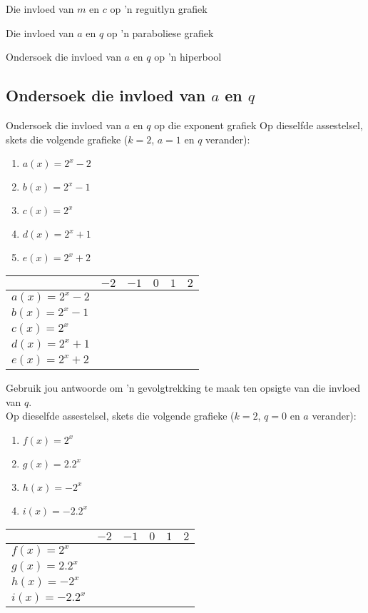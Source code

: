 \begin{Ondersoek}{Die invloed van $m$ en $c$ op 'n reguitlyn grafiek}
\begin{Ondersoek}{Die invloed van $a$ en $q$ op 'n paraboliese grafiek}
\begin{Ondersoek}{Ondersoek die invloed van $a$ en $q$ op 'n hiperbool}
\subsection*{Ondersoek die invloed van $a$ en $q$}
\begin{Ondersoek}{Ondersoek die invloed van $a$ en $q$ op die exponent grafiek}
Op dieselfde assestelsel, skets die volgende grafieke ($k=2$, $a=1$ en $q$ verander):
\begin{enumerate}[noitemsep, label=\textbf{\alph*}. ] 
\item $a(x)=2^{x}-2$
\item $b(x)=2^{x}-1$
\item $c(x)=2^{x}$
\item $d(x)=2^{x}+1$
\item $e(x)=2^{x}+2$
\end{enumerate}

\begin{table}[H]
\begin{center}
\begin{tabular}{|l|c|c|c|c|c|}
\hline
   &  $-2$ & $-1$ & $0$ & $1$ & $2$ 
\\ \hline
$a(x)=2^{x}-2$&  &&&&
\\ \hline
 $b(x)=2^{x}-1$&  &&&&
\\ \hline
$c(x)=2^{x}$&  &&&&
\\ \hline
$d(x)=2^{x}+1$&  &&&&
\\ \hline
$e(x)=2^{x}+2$&  &&&&
\\ \hline
\end{tabular}
\end{center}
\end{table}
Gebruik jou antwoorde om ’n gevolgtrekking te maak ten opsigte van die invloed van $q$.
\\

Op dieselfde assestelsel, skets die volgende grafieke ($k=2$, $q=0$ en $a$ verander):
\begin{enumerate}[noitemsep, label=\textbf{\arabic*}. ] 
\item $f(x)=2^{x}$
\item $g(x)=2.2^{x}$
\item $h(x)=-2^{x}$
\item $i(x)=-2.2^{x}$
\end{enumerate}

\begin{table}[H]
\begin{center}
\begin{tabular}{|l|c|c|c|c|c|}
\hline
   &  $-2$ & $-1$ & $0$ & $1$ & $2$ 
\\ \hline
$f(x)=2^{x}$&  &&&&
\\ \hline
$g(x)=2.2^{x}$&  &&&&
\\ \hline
 $h(x)=-2^{x}$&  &&&&
\\ \hline
$i(x)=-2.2^{x}$&  &&&&
\\ \hline


\end{tabular}
\end{center}
\end{table}
\end{Ondersoek}
\end{Ondersoek}
\end{Ondersoek}
\end{Ondersoek}

